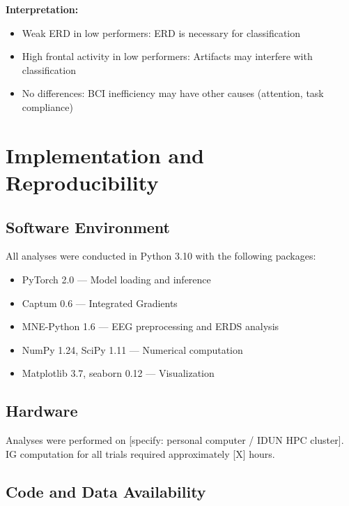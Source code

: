 \textbf{Interpretation:}
\begin{itemize}
    \item Weak ERD in low performers: ERD is necessary for classification
    \item High frontal activity in low performers: Artifacts may interfere with classification
    \item No differences: BCI inefficiency may have other causes (attention, task compliance)
\end{itemize}


\section{Implementation and Reproducibility}
\label{sec:methods_implementation}

\subsection{Software Environment}

All analyses were conducted in Python 3.10 with the following packages:

\begin{itemize}
    \item PyTorch 2.0 \cite{paszke2019pytorch} — Model loading and inference
    \item Captum 0.6 \cite{kokhlikyan2020captum} — Integrated Gradients
    \item MNE-Python 1.6 \cite{gramfort2013mne} — EEG preprocessing and ERDS analysis
    \item NumPy 1.24, SciPy 1.11 — Numerical computation
    \item Matplotlib 3.7, seaborn 0.12 — Visualization
\end{itemize}

\subsection{Hardware}

Analyses were performed on [specify: personal computer / IDUN HPC cluster]. IG computation for all trials required approximately [X] hours.

\subsection{Code and Data Availability}


